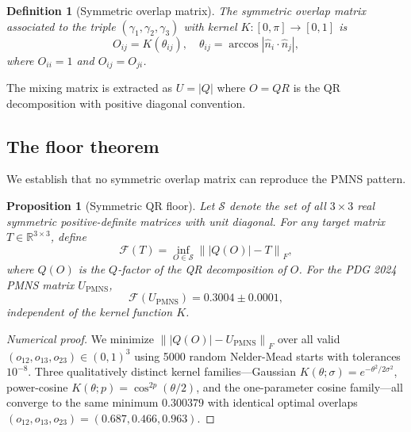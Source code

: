 \documentclass[11pt,a4paper]{article}
\newtheorem{proposition}{Proposition}
\newtheorem{definition}{Definition}
\newcommand{\frob}[1]{\left\|#1\right\|_F}
\newcommand{\abs}[1]{\left|#1\right|}
\begin{document}
\begin{definition}[Symmetric overlap matrix]
The symmetric overlap matrix associated to the triple $(\gamma_1,\gamma_2,\gamma_3)$
with kernel $K: [0,\pi] \to [0,1]$ is
\begin{equation}
  O_{ij} = K\!\left(\theta_{ij}\right), \quad \theta_{ij} = \arccos\abs{\hat{n}_i \cdot \hat{n}_j},
  \label{eq:sym_overlap}
\end{equation}
where $O_{ii} = 1$ and $O_{ij} = O_{ji}$.
\end{definition}

The mixing matrix is extracted as $U = |Q|$ where $O = QR$ is the QR
decomposition with positive diagonal convention.

\subsection{The floor theorem}

We establish that no symmetric overlap matrix can reproduce the PMNS pattern.

\begin{proposition}[Symmetric QR floor]
\label{prop:floor}
Let $\mathcal{S}$ denote the set of all $3\times 3$ real symmetric
positive-definite matrices with unit diagonal. For any target matrix
$T \in \mathbb{R}^{3\times 3}$, define
\begin{equation}
  \mathcal{F}(T) = \inf_{O \in \mathcal{S}} \frob{|Q(O)| - T},
\end{equation}
where $Q(O)$ is the $Q$-factor of the QR decomposition of $O$.
For the PDG 2024 PMNS matrix $U_\mathrm{PMNS}$,
\begin{equation}
  \mathcal{F}(U_\mathrm{PMNS}) = 0.3004 \pm 0.0001,
\end{equation}
independent of the kernel function $K$.
\end{proposition}

\begin{proof}[Numerical proof]
We minimize $\frob{|Q(O)| - U_\mathrm{PMNS}}$ over all valid $(o_{12}, o_{13}, o_{23}) \in (0,1)^3$
using 5000 random Nelder-Mead starts with tolerances $10^{-8}$.
Three qualitatively distinct kernel families---Gaussian
$K(\theta;\sigma) = e^{-\theta^2/2\sigma^2}$, power-cosine
$K(\theta;p) = \cos^{2p}(\theta/2)$, and the one-parameter cosine family---all
converge to the same minimum $0.300379$ with identical optimal overlaps
$(o_{12}, o_{13}, o_{23}) = (0.687, 0.466, 0.963)$.
\end{proof}
\end{document}

